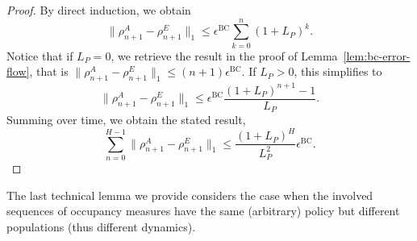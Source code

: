 \documentclass{article}
\begin{document}
\begin{proof}
%
By direct induction, we obtain
\begin{equation}
    \|\rho_{n+1}^A - \rho_{n+1}^E\|_1 \leq \epsilon^\mathrm{BC} \sum_{k=0}^{n} (1+L_P)^k.
\end{equation}
Notice that if $L_P=0$, we retrieve the result in the proof of Lemma~\ref{lem:bc-error-flow}, that is $\|\rho_{n+1}^A - \rho_{n+1}^E\|_1 \leq (n+1)\epsilon^\mathrm{BC}$. If $L_P > 0$, this simplifies to
\begin{equation}
    \|\rho_{n+1}^A - \rho_{n+1}^E\|_1 \leq \epsilon^\mathrm{BC} \frac{(1+L_P)^{n+1}-1}{L_P}.
    \label{eq:titi}
\end{equation}
Summing over time, we obtain the stated result,
\begin{equation}
    \sum_{n=0}^{H-1} \|\rho_{n+1}^A - \rho_{n+1}^E\|_1 \leq \frac{(1+L_P)^H}{L_P^2} \epsilon^\mathrm{BC}.
\end{equation}
\end{proof}

The last technical lemma we provide considers the case when the involved sequences of occupancy measures have the same (arbitrary) policy but different populations (thus different dynamics).
\end{document}
